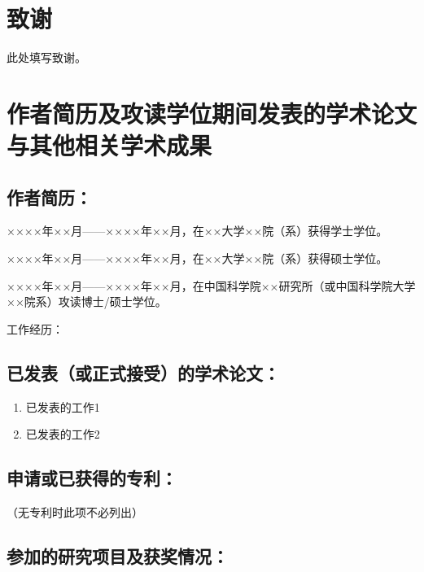 \ifblind

\else

\chapter[致谢]{致\quad 谢}%

此处填写致谢。


\chapter{作者简历及攻读学位期间发表的学术论文与其他相关学术成果}

\section*{作者简历：}
××××年××月——××××年××月，在××大学××院（系）获得学士学位。

××××年××月——××××年××月，在××大学××院（系）获得硕士学位。

××××年××月——××××年××月，在中国科学院××研究所（或中国科学院大学××院系）攻读博士/硕士学位。

工作经历：

\section*{已发表（或正式接受）的学术论文：}

{
\setlist[enumerate]{}%
\begin{enumerate}[nosep]
    \item 已发表的工作1
    \item 已发表的工作2
\end{enumerate}
}

\section*{申请或已获得的专利：}

（无专利时此项不必列出）

\section*{参加的研究项目及获奖情况：}

\fi

\cleardoublepage[plain]%
